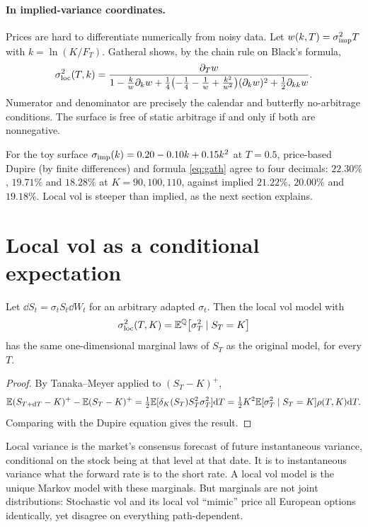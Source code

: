 \paragraph{In implied-variance coordinates.} Prices are hard to differentiate numerically from noisy data. Let $w(k,T)=\sigma_{\rm imp}^2T$ with $k=\ln(K/F_T)$. Gatheral shows, by the chain rule on Black's formula,
\begin{equation}\label{eq:gath}
\sigma_{\rm loc}^2(T,k)=\frac{\partial_Tw}{1-\frac{k}{w}\partial_kw+\frac14\bigl(-\frac14-\frac1w+\frac{k^2}{w^2}\bigr)(\partial_kw)^2+\frac12\partial_{kk}w}.
\end{equation}
Numerator and denominator are precisely the calendar and butterfly no-arbitrage conditions. The surface is free of static arbitrage if and only if both are nonnegative.

\begin{numcheck}
For the toy surface $\sigma_{\rm imp}(k)=0.20-0.10k+0.15k^2$ at $T=0.5$, price-based Dupire (by finite differences) and formula \eqref{eq:gath} agree to four decimals: $22.30\%$, $19.71\%$ and $18.28\%$ at $K=90,100,110$, against implied $21.22\%$, $20.00\%$ and $19.18\%$. Local vol is steeper than implied, as the next section explains.
\end{numcheck}

\section{Local vol as a conditional expectation}

\begin{theorem}\label{thm:gyongy}
Let $\dd S_t=\sigma_tS_t\dd W_t$ for an arbitrary adapted $\sigma_t$. Then the local vol model with
\[
\sigma_{\rm loc}^2(T,K)=\mathbb{E}^{\mathbb{Q}}\bigl[\sigma_T^2\mid S_T=K\bigr]
\]
has the same one-dimensional marginal laws of $S_T$ as the original model, for every $T$.
\end{theorem}
\begin{proof}
By Tanaka--Meyer applied to $(S_T-K)^+$,
\[
\mathbb{E}(S_{T+\mathrm{d} T}-K)^+-\mathbb{E}(S_T-K)^+=\tfrac12\mathbb{E}[\delta_K(S_T)S_T^2\sigma_T^2]\mathrm{d} T=\tfrac12K^2\mathbb{E}[\sigma_T^2\mid S_T=K]\rho(T,K)\mathrm{d} T.
\]
Comparing with the Dupire equation gives the result.
\end{proof}

\begin{intuition}
Local variance is the market's consensus forecast of future instantaneous variance, conditional on the stock being at that level at that date. It is to instantaneous variance what the forward rate is to the short rate. A local vol model is the unique Markov model with these marginals. But marginals are not joint distributions: Stochastic vol and its local vol ``mimic'' price all European options identically, yet disagree on everything path-dependent.
\end{intuition}

